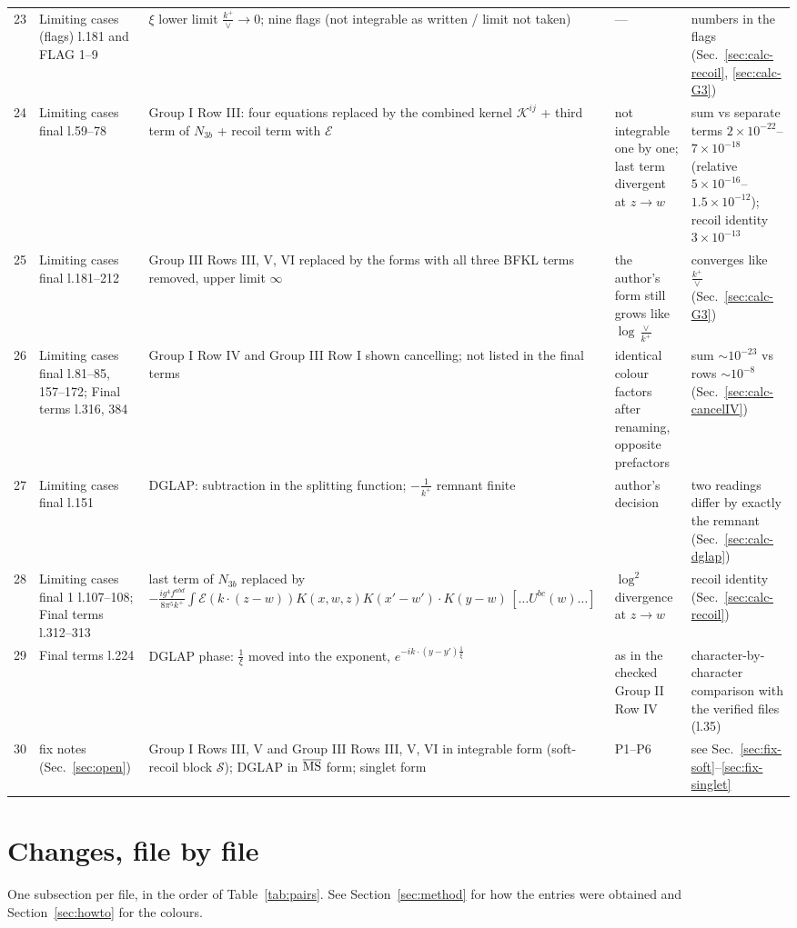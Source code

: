 \documentclass[10pt]{article}
\begin{document}
{\begin{longtable}{@{}p{0.4cm}p{2.7cm}p{5.0cm}p{4.0cm}p{4.0cm}@{}}
23 & Limiting cases (flags) l.181 and FLAG 1--9 & $\xi$ lower limit $\frac{k^{+}}{\vee}\to0$; nine flags (not integrable as written / limit not taken) & --- & numbers in the flags (Sec.~\ref{sec:calc-recoil}, \ref{sec:calc-G3})\\
24 & Limiting cases final l.59--78 & Group I Row III: four equations replaced by the combined kernel $\mathcal{K}^{ij}$ + third term of $N_{3b}$ + recoil term with $\mathcal{E}$ & not integrable one by one; last term divergent at $z\to w$ & sum vs separate terms $2\times10^{-22}$--$7\times10^{-18}$ (relative $5\times10^{-16}$--$1.5\times10^{-12}$); recoil identity $3\times10^{-13}$\\
25 & Limiting cases final l.181--212 & Group III Rows III, V, VI replaced by the forms with all three BFKL terms removed, upper limit $\infty$ & the author's form still grows like $\log\frac{\vee}{k^{+}}$ & converges like $\frac{k^{+}}{\vee}$ (Sec.~\ref{sec:calc-G3})\\
26 & Limiting cases final l.81--85, 157--172; Final terms l.316, 384 & Group I Row IV and Group III Row I shown cancelling; not listed in the final terms & identical colour factors after renaming, opposite prefactors & sum $\sim10^{-23}$ vs rows $\sim10^{-8}$ (Sec.~\ref{sec:calc-cancelIV})\\
27 & Limiting cases final l.151 & DGLAP: subtraction in the splitting function; $-\frac{1}{k^{+}}$ remnant finite & author's decision & two readings differ by exactly the remnant (Sec.~\ref{sec:calc-dglap})\\
28 & Limiting cases final 1 l.107--108; Final terms l.312--313 & last term of $N_{3b}$ replaced by $-\frac{ig^{4}f^{abd}}{8\pi^{5}k^{+}}\int\mathcal{E}(k\cdot(z-w))K(x,w,z)K(x'-w')\cdot K(y-w)\,[\dots U^{bc}(w)\dots]$ & $\log^{2}$ divergence at $z\to w$ & recoil identity (Sec.~\ref{sec:calc-recoil})\\
29 & Final terms l.224 & DGLAP phase: $\frac{1}{\xi}$ moved into the exponent, $e^{-ik\cdot(y-y')\frac1\xi}$ & as in the checked Group II Row IV & character-by-character comparison with the verified files (l.35)\\
30 & fix notes (Sec.~\ref{sec:open}) & Group I Rows III, V and Group III Rows III, V, VI in integrable form (soft-recoil block $\mathcal{S}$); DGLAP in $\overline{\rm MS}$ form; singlet form & P1--P6 & see Sec.~\ref{sec:fix-soft}--\ref{sec:fix-singlet}\\
\end{longtable}
}

\clearpage
\section{Changes, file by file}\label{sec:files}
\noindent One subsection per file, in the order of Table~\ref{tab:pairs}. See Section~\ref{sec:method} for how the entries were obtained and Section~\ref{sec:howto} for the colours.
\bigskip
\end{document}
